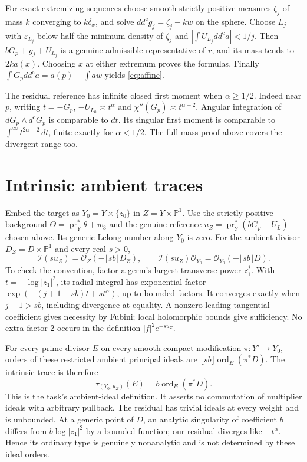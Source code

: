 \documentclass[11pt]{article}
\theoremstyle{remark}
\newcommand{\ddc}{dd^{\mathrm c}}
\newcommand{\dc}{d^{\mathrm c}}
\newcommand{\PP}{\mathbb P}
\begin{document}
For exact extremizing sequences choose smooth strictly positive measures
$\zeta_j$ of mass $k$ converging to $k\delta_x$, and solve
$\ddc g_j=\zeta_j-kw$ on the sphere. Choose $L_j$ with
$\varepsilon_{L_j}$ below half the minimum density of $\zeta_j$ and
$|\int U_{L_j}\ddc a|<1/j$. Then $bG_p+g_j+U_{L_j}$ is a genuine
admissible representative of $r$, and its mass tends to $2k a(x)$.
Choosing $x$ at either extremum proves the formulas. Finally
$\int G_p\ddc a=a(p)-\int aw$ yields \eqref{eq:affine}.

The residual reference has infinite closed first moment when
$\alpha\geq1/2$. Indeed near $p$, writing $t=-G_p$,
$-U_{L_0}\asymp t^\alpha$ and
$\chi''(G_p)\asymp t^{\alpha-2}$. Angular integration of
$dG_p\wedge\dc G_p$ is comparable to $dt$. Its singular first moment
is comparable to $\int^\infty t^{2\alpha-2}\,dt$, finite exactly for
$\alpha<1/2$. The full mass proof above covers the divergent range too.

\section{Intrinsic ambient traces}
Embed the target as $Y_0=Y\times\{z_0\}$ in $Z=Y\times\PP^1$.
Use the strictly positive background
$\Theta=\operatorname{pr}_Y^*\theta+w_3$ and the genuine reference
$u_Z=\operatorname{pr}_Y^*(bG_p+U_L)$ chosen above.
Its generic Lelong number along $Y_0$ is zero. For the ambient divisor
$D_Z=D\times\PP^1$ and every real $s>0$,
\[
 \mathcal I(su_Z)=\mathcal O_Z(-\lfloor sb\rfloor D_Z),\qquad
 \mathcal I(su_Z)\mathcal O_{Y_0}
       =\mathcal O_{Y_0}(-\lfloor sb\rfloor D).
\]
To check the convention, factor a germ's largest transverse power
$z_1^j$. With $t=-\log|z_1|^2$, its radial integral has exponential
factor $\exp(-(j+1-sb)t+st^\alpha)$, up to bounded factors.
It converges exactly when $j+1>sb$, including divergence at equality.
A nonzero leading tangential coefficient gives necessity by Fubini;
local holomorphic bounds give sufficiency. No extra factor $2$ occurs
in the definition $|f|^2e^{-su_Z}$.

For every prime divisor $E$ on every smooth compact modification
$\pi:Y'\to Y_0$, orders of these restricted ambient principal ideals are
$\lfloor sb\rfloor\operatorname{ord}_E(\pi^*D)$. The intrinsic trace is
therefore
\[
 \tau_{(Y_0,u_Z)}(E)=b\operatorname{ord}_E(\pi^*D).
\]
This is the task's ambient-ideal definition. It asserts no commutation of
multiplier ideals with arbitrary pullback. The residual has trivial ideals
at every weight and is unbounded. At a generic point of $D$, an analytic
singularity of coefficient $b$ differs from $b\log|z_1|^2$ by a bounded
function; our residual diverges like $-t^\alpha$. Hence its ordinary type
is genuinely nonanalytic and is not determined by these ideal orders.
\end{document}
